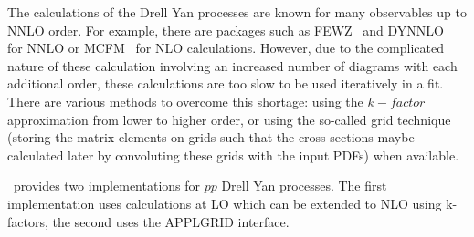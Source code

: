 %
The calculations of the Drell Yan processes are known for many observables up to NNLO order.
For example, there are packages such as FEWZ~\cite{FEWZ} and DYNNLO~\cite{DYNNLO} for NNLO
or MCFM~\cite{MCFM} for NLO calculations. However, due to the complicated nature of these
calculation involving an increased number of diagrams with each additional order, these 
calculations are too slow to be used iteratively in a fit.
There are various methods to overcome this shortage: using the $k-factor$ approximation 
from lower to higher order, or using the so-called grid technique 
(storing the matrix elements on grids such that the cross sections maybe calculated later by 
convoluting these grids with the input PDFs) when available.
  
\fitter\ provides two implementations for $pp$  Drell Yan processes.
The first implementation uses calculations at LO which can be extended to NLO using k-factors,
the second uses the APPLGRID interface. 
%


